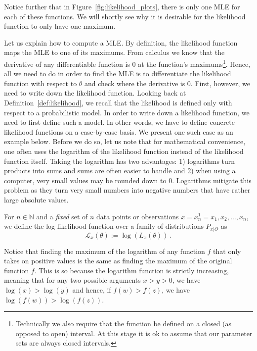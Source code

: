 Notice further that in Figure~\ref{fig:likelihood_plots}, there is only one MLE for each of these functions. We will shortly see why it is desirable for 
the likelihood function to only have one maximum.

Let us explain how to compute a MLE. By definition, the likelihood function maps the MLE to
one of its maximums. From calculus we know that the derivative of any differentiable function is 0 at the
function's maximums\footnote{Technically we also require that the function be defined on a closed 
(as opposed to open) interval. At this stage it is ok to assume that our parameter sets are always closed
intervals.}. Hence, all we need to do in order to find the MLE is to differentiate the likelihood 
function with respect to $ \theta $ and check where the derivative is 0. 
First, however, we need to write down the likelihood function.
Looking back at Definition~\ref{def:likelihood}, we recall that the likelihood is defined only
with respect to a probabilistic model. In order to write down a likelihood function, we need to first
define such a model. In other words, we have to define concrete likelihood functions on a case-by-case 
basis. We present one such case as an example below. Before we do so, let us note that for mathematical
convenience, one often uses the logarithm of the likelihood function instead of the likelihood function
itself. Taking the logarithm has two advantages: 1) logarithms turn products into sums and sums are often easier to handle
and 2) when using a computer, very small values may be rounded down to 0. Logarithms mitigate this problem
as they turn very small numbers into negative numbers that have rather large absolute values.

\begin{Definition}
For $n \in \mathbb{N} $ and a \emph{fixed} set of $n$ data points or observations $ x = x^{1}_{n} = x_1,x_2,\ldots,x_n $, we define the 
log-likelihood function over a 
family of distributions $ P_{x|\Theta} $ as 
$$ \mathcal{L}_{x}(\theta) := \log \left(L_{x}(\theta) \right) \ . $$
\end{Definition}

Notice that finding the maximum of the logarithm of any function $ f $ that only takes on positive values is the same as finding
the maximum of the original function $ f $. This is so because the logarithm function is strictly increasing, meaning that for any
two possible arguments $ x >y>0 $, we have $ \log(x) > \log(y) $ and hence, if $f(w) > f(z)$, we have $\log(f(w)) > \log(f(z))$.

